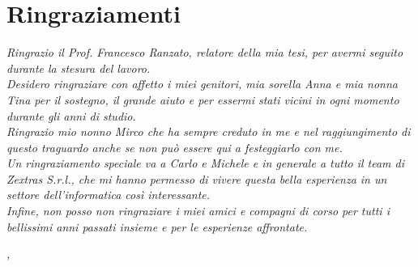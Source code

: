 \cleardoublepage
{}
\thispagestyle{empty}


\begingroup
\let\clearpage\relax
\let\cleardoublepage\relax
\let\cleardoublepage\relax

\chapter*{Ringraziamenti}

\noindent \textit{Ringrazio il Prof. Francesco Ranzato, relatore della mia tesi, per avermi seguito durante la stesura del lavoro.}\\

\noindent \textit{Desidero ringraziare con affetto i miei genitori, mia sorella Anna e mia nonna Tina per il sostegno, il grande aiuto e per essermi stati vicini in ogni momento durante gli anni di studio.}\\

\noindent \textit{Ringrazio mio nonno Mirco che ha sempre creduto in me e nel raggiungimento di questo traguardo anche se non può essere qui a festeggiarlo con me.}\\

\noindent \textit{Un ringraziamento speciale va a Carlo e Michele e in generale a tutto il team di Zextras S.r.l., che mi hanno permesso di vivere questa bella esperienza in un settore dell’informatica così interessante.}\\

\noindent \textit{Infine, non posso non ringraziare i miei amici e compagni di corso per tutti i bellissimi anni passati insieme e per le esperienze affrontate.}
\bigskip
\bigskip
   
\noindent\textit{\myLocation, \myTime}
\hfill \myName

\endgroup
